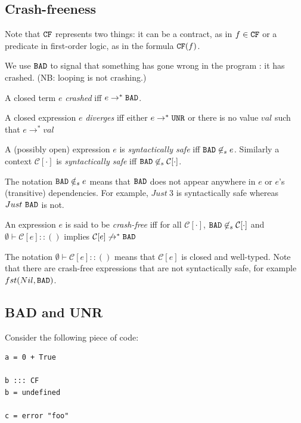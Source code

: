 \documentclass[preprint]{sigplanconf}
\begin{document}
\subsection{Crash-freeness}\label{sec:cf}
Note that $\texttt{CF}$ represents two things: it can be a contract, as in $f
\in \texttt{CF}$ or a predicate in first-order logic, as in the formula $\texttt{CF}(f)$.

We use $\texttt{BAD}$ to signal that something has gone wrong in the program :
it has crashed. (NB: looping is not crashing.)

\begin{definition}[Crash]
A closed term $e$ \emph{crashed} iff $e \to^* \texttt{BAD}$.
\end{definition}

\begin{definition}[Diverges]
A closed expression $e$ \emph{diverges} iff either $e \to^* \texttt{UNR}$ or there is
no value $val$ such that $e \to^* val$
\end{definition}

\begin{definition}
A (possibly open) expression $e$ is \emph{syntactically safe} iff $\texttt{BAD} \not
\in_s e$. Similarly a context $\mathcal{C}[\cdot]$ is \emph{syntactically safe} iff $\texttt{BAD}
\not \in_s \mathcal{C}[\cdot]$.
\end{definition}

The notation $\texttt{BAD} \notin_s e$ means that $\texttt{BAD}$ does not appear
anywhere in $e$ or $e$'s (transitive) dependencies.  For
example, $Just ~3$ is syntactically safe whereas $Just ~\texttt{BAD}$ is not.

\begin{definition}\label{def:cf}
An expression $e$ is said to be \emph{crash-free} iff 
for all $\mathcal{C}[\cdot]$, $\texttt{BAD} \not \in_s \mathcal{C}[\cdot]$ and $\emptyset \vdash
\mathcal{C}[e] :: ()$ implies $\mathcal{C}[e] \not \to^* \texttt{BAD}$
\end{definition}
The notation $\emptyset \vdash \mathcal{C}[e] :: ()$ means that
$\mathcal{C}[e]$ is closed and well-typed.  Note
that there are crash-free expressions that are not syntactically safe,
for example $fst(Nil,\texttt{BAD})$.

\subsection{BAD and UNR}
Consider the following piece of code:
\begin{verbatim}
a = 0 + True

b ::: CF
b = undefined

c = error "foo"
\end{verbatim}
\end{document}
